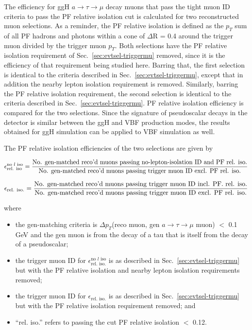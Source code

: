 The efficiency for ggH $a\rightarrow\tau\rightarrow\mu$ decay muons that pass the tight muon ID criteria to pass the PF relative isolation cut is calculated for two reconstructed muon selections.  As a reminder, the PF relative isolation is defined as the $p_T$ sum of all PF hadrons and photons within a cone of $\Delta$R = 0.4 around the trigger muon divided by the trigger muon $p_T$.  Both selections have the PF relative isolation requirement of Sec.~\ref{sec:evtsel-triggermu} removed, since it is the efficiency of that requirement being studied here.   Barring that, the first selection is identical to the criteria described in Sec.~\ref{sec:evtsel-triggermu}, except that in addition the nearby lepton isolation requirement is removed.  Similarly, barring the PF relative isolation requirement, the second selection is identical to the criteria described in Sec.~\ref{sec:evtsel-triggermu}.  PF relative isolation efficiency is compared for the two selections.  Since the signature of pseudoscalar decays in the detector is similar between the ggH and VBF production modes, the results obtained for ggH simulation can be applied to VBF simulation as well.

The PF relative isolation efficiencies of the two selections are given by 

\begin{equation}
\epsilon_{\text{rel. iso}}^{\text{no }l\text{ iso}} = \frac{\text{No. gen-matched reco'd muons passing no-lepton-isolation ID and PF rel. iso.}}{\text{No. gen-matched reco'd muons passing trigger muon ID excl. PF rel. iso.}} \\
\label{eq:muonPFRelIsoeff-noliso}
\end{equation}

\begin{equation}
\epsilon_{\text{rel. iso.}} = \frac{\text{No. gen-matched reco'd muons passing trigger muon ID incl. PF. rel. iso.}}{\text{No. gen-matched reco'd muons passing trigger muon ID excl. PF rel. iso.}} \\
\label{eq:muonPFRelIsoeff}
\end{equation}

where

\begin{itemize}
\item the gen-matching criteria is $\Delta$$p_T$(reco muon, gen $a\rightarrow\tau\rightarrow\mu$ muon) $<$ 0.1 GeV and the gen muon is from the decay of a tau that is itself from the decay of a pseudoscalar;
\item the trigger muon ID for $\epsilon_{\text{rel. iso.}}^{\text{no }l\text{ iso}}$ is as described in Sec.~\ref{sec:evtsel-triggermu} but with the PF relative isolation and nearby lepton isolation requirements removed;
\item the trigger muon ID for $\epsilon_{\text{rel. iso.}}$ is as described in Sec.~\ref{sec:evtsel-triggermu} but with the PF relative isolation requirement removed; and
\item ``rel. iso.'' refers to passing the cut PF relative isolation $<$ 0.12.
\end{itemize}

